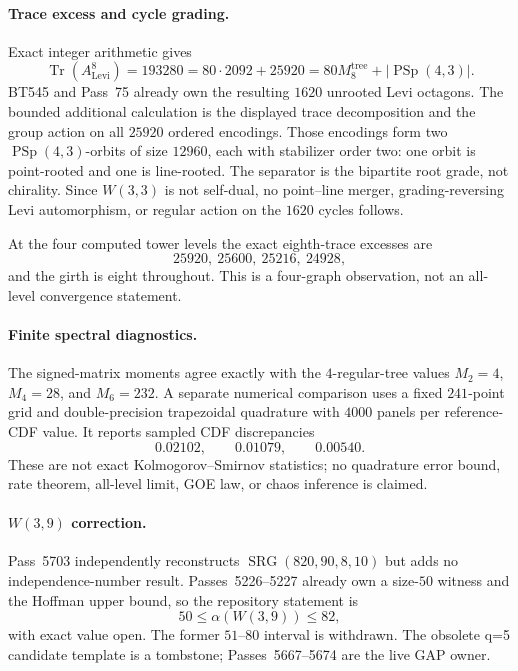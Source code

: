 \paragraph{Trace excess and cycle grading.}
Exact integer arithmetic gives
\[
 \operatorname{Tr}(A_{\mathrm{Levi}}^8)
 =
 193280
 =
 80\cdot2092+25920
 =
 80M_8^{\mathrm{tree}}+|\operatorname{PSp}(4,3)|.
\]
BT545 and Pass~75 already own the resulting $1620$ unrooted Levi octagons.
The bounded additional calculation is the displayed trace decomposition and
the group action on all $25920$ ordered encodings.  Those encodings form two
$\operatorname{PSp}(4,3)$-orbits of size $12960$, each with stabilizer order
two: one orbit is point-rooted and one is line-rooted.  The separator is the
bipartite root grade, not chirality.  Since $W(3,3)$ is not self-dual, no
point--line merger, grading-reversing Levi automorphism, or regular action on
the $1620$ cycles follows.

At the four computed tower levels the exact eighth-trace excesses are
\[
 25920,\ 25600,\ 25216,\ 24928,
\]
and the girth is eight throughout.  This is a four-graph observation, not an
all-level convergence statement.

\paragraph{Finite spectral diagnostics.}
The signed-matrix moments agree exactly with the $4$-regular-tree values
$M_2=4$, $M_4=28$, and $M_6=232$.  A separate numerical comparison uses a
fixed $241$-point grid and double-precision trapezoidal quadrature with $4000$
panels per reference-CDF value.  It reports sampled CDF discrepancies
\[
 0.02102,\qquad 0.01079,\qquad 0.00540.
\]
These are not exact Kolmogorov--Smirnov statistics; no quadrature error bound,
rate theorem, all-level limit, GOE law, or chaos inference is claimed.

\paragraph{$W(3,9)$ correction.}
Pass~5703 independently reconstructs
$\operatorname{SRG}(820,90,8,10)$ but adds no independence-number result.
Passes~5226--5227 already own a size-$50$ witness and the Hoffman upper bound,
so the repository statement is
\[
 50\leq\alpha(W(3,9))\leq82,
\]
with exact value open.  The former $51$--$80$ interval is withdrawn.  The
obsolete q=5 candidate template is a tombstone; Passes~5667--5674 are the live
GAP owner.

